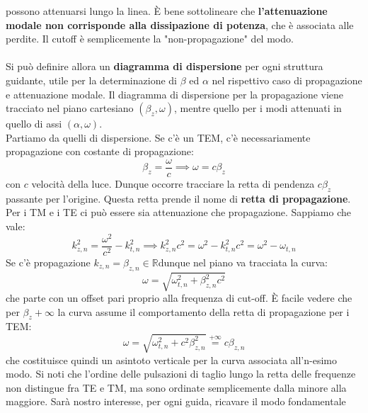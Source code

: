 \documentclass{book}
\begin{document}
    possono attenuarsi lungo la linea. È bene sottolineare che \textbf{l'attenuazione modale non corrisponde alla dissipazione di potenza}, che è associata alle perdite. Il cutoff 
    è semplicemente la "non-propagazione" del modo. \\ \\
    Si può definire allora un \textbf{diagramma di dispersione} per ogni struttura guidante, utile per la determinazione di $\beta$ ed $\alpha$ nel rispettivo caso di 
    propagazione e attenuazione modale. Il diagramma di dispersione per la propagazione viene tracciato nel piano cartesiano $(\beta_{z}, \omega)$, mentre
    quello per i modi attenuati in quello di assi $(\alpha, \omega)$. 
    \\ Partiamo da quelli di dispersione. Se c'è un TEM, c'è necessariamente propagazione con costante di propagazione:
    \begin{equation}
        \beta_{z} = \frac{\omega}{c} \implies \omega = c \beta_{z}
    \end{equation}
    con $c$ velocità della luce. Dunque occorre tracciare la retta di pendenza $c \beta_{z}$ passante per l'origine. Questa retta 
    prende il nome di \textbf{retta di propagazione}. \\
    Per i TM e i TE ci può essere sia attenuazione che propagazione. Sappiamo che vale:
    \begin{equation}
        k_{z,n} ^{2} = \frac{\omega ^{2}}{c^{2}}-k_{t,n} ^{2} \implies k_{z,n} ^{2}c^{2}=\omega ^{2}-k_{t,n} ^{2}c^{2} = \omega^{2}-\omega_{t,n}
    \end{equation}
    Se c'è propagazione $k_{z,n} = \beta_{z,n} \in \mathbb{R}$dunque nel piano va tracciata la curva:
    \begin{equation}
        \omega = \sqrt{\omega_{t,n} ^{2}+\beta_{z,n} ^{2}c^{2}}
    \end{equation}
    che parte con un offset pari proprio alla frequenza di cut-off. È facile vedere che per $\beta_{z} + \infty$ la curva assume il comportamento
    della retta di propagazione per i TEM:
    \begin{equation}
        \omega = \sqrt{\omega^{2} _{t,n} +c^{2} \beta_{z,n} ^{2}} \stackrel{+\infty}{=}  c\beta_{z,n}
    \end{equation} 
    che costituisce quindi un asintoto verticale per la curva associata all'n-esimo modo. Si noti che l'ordine delle pulsazioni di taglio lungo la retta
    delle frequenze non distingue fra TE e TM, ma sono ordinate semplicemente dalla minore alla maggiore. Sarà nostro interesse, per ogni guida, ricavare il modo fondamentale 
\end{document}
